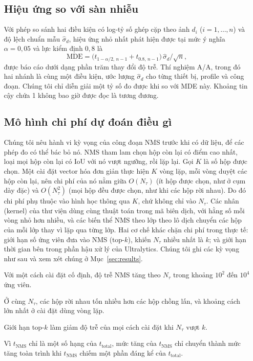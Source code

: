 \documentclass[12pt,a4paper]{article}
\newcommand{\Ntau}{N_{\tau}}
\begin{document}
\subsection{Hiệu ứng so với sàn nhiễu}
Với phép so sánh hai điều kiện có log-tỷ số ghép cặp theo ảnh $d_i$ ($i=1,\dots,n$) và độ lệch chuẩn mẫu $\hat\sigma_d$, hiệu ứng nhỏ nhất phát hiện được tại mức ý nghĩa $\alpha=0{,}05$ và lực kiểm định $0{,}8$ là
\begin{equation}
\mathrm{MDE}=\bigl(t_{1-\alpha/2,\,n-1}+t_{0.8,\,n-1}\bigr)\,\hat\sigma_d/\sqrt{n},
\end{equation}
được báo cáo dưới dạng phần trăm thay đổi độ trễ. Thí nghiệm A/A, trong đó hai nhánh là cùng một điều kiện, ước lượng $\hat\sigma_d$ cho từng thiết bị, profile và công đoạn. Chúng tôi chỉ diễn giải một tỷ số đo được khi so với MDE này. Khoảng tin cậy chứa 1 không bao giờ được đọc là tương đương.

\subsection{Mô hình chi phí dự đoán điều gì}
Chúng tôi nêu hành vi kỳ vọng của công đoạn NMS trước khi có dữ liệu, để các phép đo có thể bác bỏ nó. NMS tham lam chọn hộp còn lại có điểm cao nhất, loại mọi hộp còn lại có IoU với nó vượt ngưỡng, rồi lặp lại. Gọi $K$ là số hộp được chọn. Một cài đặt vector hóa đơn giản thực hiện $K$ vòng lặp, mỗi vòng duyệt các hộp còn lại, nên chi phí của nó nằm giữa $O(\Ntau)$ (ít hộp được chọn, như ở cụm dày đặc) và $O(\Ntau^2)$ (mọi hộp đều được chọn, như khi các hộp rời nhau). Do đó chi phí phụ thuộc vào hình học thông qua $K$, chứ không chỉ vào $\Ntau$. Các nhân (kernel) của thư viện dùng cùng thuật toán trong mã biên dịch, với hằng số mỗi vòng nhỏ hơn nhiều, và các biến thể NMS theo lớp theo lô dịch chuyển các hộp của mỗi lớp thay vì lặp qua từng lớp. Hai cơ chế khác chặn chi phí trong thực tế: giới hạn số ứng viên đưa vào NMS (top-$k$), khiến $\Ntau$ nhiều nhất là $k$; và giới hạn thời gian bên trong phần hậu xử lý của Ultralytics. Chúng tôi ghi các kỳ vọng như sau và xem xét chúng ở Mục~\ref{sec:results}.
\begin{description}[leftmargin=2.5em,labelwidth=2.2em,itemsep=2pt]
\item[H1] Với một cách cài đặt cố định, độ trễ NMS tăng theo $\Ntau$ trong khoảng $10^2$ đến $10^4$ ứng viên.
\item[H2] Ở cùng $\Ntau$, các hộp rời nhau tốn nhiều hơn các hộp chồng lấn, và khoảng cách lớn nhất ở cài đặt dùng vòng lặp.
\item[H3] Giới hạn top-$k$ làm giảm độ trễ của mọi cách cài đặt khi $\Ntau$ vượt $k$.
\item[H4] Vì $t_{\mathrm{NMS}}$ chỉ là một số hạng của $t_{\mathrm{total}}$, mức tăng của $t_{\mathrm{NMS}}$ chỉ chuyển thành mức tăng toàn trình khi $t_{\mathrm{NMS}}$ chiếm một phần đáng kể của $t_{\mathrm{total}}$.
\end{description}
\end{document}
